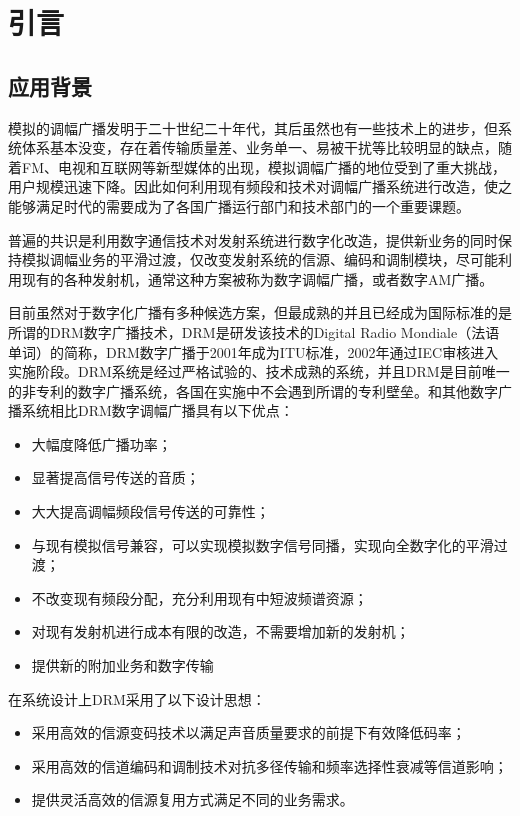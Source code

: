 \chapter{引言}
\label{chap:intro}
\section{应用背景}

模拟的调幅广播发明于二十世纪二十年代，其后虽然也有一些技术上的进步，但系统体系基本没变，存在着传输质量差、业务单一、易被干扰等比较明显的缺点，随着FM、电视和互联网等新型媒体的出现，模拟调幅广播的地位受到了重大挑战，用户规模迅速下降。因此如何利用现有频段和技术对调幅广播系统进行改造，使之能够满足时代的需要成为了各国广播运行部门和技术部门的一个重要课题。

普遍的共识是利用数字通信技术对发射系统进行数字化改造，提供新业务的同时保持模拟调幅业务的平滑过渡，仅改变发射系统的信源、编码和调制模块，尽可能利用现有的各种发射机，通常这种方案被称为数字调幅广播，或者数字AM广播。

目前虽然对于数字化广播有多种候选方案，但最成熟的并且已经成为国际标准的是所谓的DRM数字广播技术，DRM是研发该技术的Digital Radio Mondiale（法语单词）的简称，DRM数字广播于2001年成为ITU标准，2002年通过IEC审核进入实施阶段。DRM系统是经过严格试验的、技术成熟的系统，并且DRM是目前唯一的非专利的数字广播系统，各国在实施中不会遇到所谓的专利壁垒。和其他数字广播系统相比DRM数字调幅广播具有以下优点：

\begin{itemize}
	\item 大幅度降低广播功率；
	\item 显著提高信号传送的音质；
	\item 大大提高调幅频段信号传送的可靠性；
	\item 与现有模拟信号兼容，可以实现模拟数字信号同播，实现向全数字化的平滑过渡；
	\item 不改变现有频段分配，充分利用现有中短波频谱资源；
	\item 对现有发射机进行成本有限的改造，不需要增加新的发射机；
	\item 提供新的附加业务和数字传输
\end{itemize}

在系统设计上DRM采用了以下设计思想：

\begin{itemize}
	\item 采用高效的信源变码技术以满足声音质量要求的前提下有效降低码率；
	\item 采用高效的信道编码和调制技术对抗多径传输和频率选择性衰减等信道影响；
	\item 提供灵活高效的信源复用方式满足不同的业务需求。
\end{itemize}

